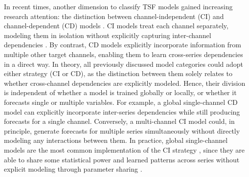 \documentclass[a4paper,oneside,bibliography=totoc]{scrbook}
\begin{document}
\noindent
In recent times, another dimension to classify TSF models gained increasing research attention: the distinction between channel-independent (CI) and channel-dependent (CD) models \cite{nie_time_2022, zeng_are_2023, han_capacity_2024}.
CI models treat each channel separately, modeling them in isolation without explicitly capturing inter-channel dependencies \cite{han_capacity_2024}. 
By contrast, CD models explicitly incorporate information from multiple other target channels, enabling them to learn cross-series dependencies in a direct way.
In theory, all previously discussed model categories could adopt either strategy (CI or CD), as the distinction between them solely relates to whether cross-channel dependencies are explicitly modeled. 
Hence, their division is independent of whether a model is trained globally or locally, or whether it forecasts single or multiple variables.
For example, a global single-channel CD model can explicitly incorporate inter-series dependencies while still producing forecasts for a single channel. 
Conversely, a multi-channel CI model could, in principle, generate forecasts for multiple series simultaneously without directly modeling any interactions between them.
In practice, global single-channel models are the most common implementation of the CI strategy \cite{nie_time_2022, lin_cyclenet_2024, challu_nhits_2023}, since they are able to share some statistical power and learned patterns across series without explicit modeling through parameter sharing \cite{rangapuram_deep_2018}.
\end{document}
